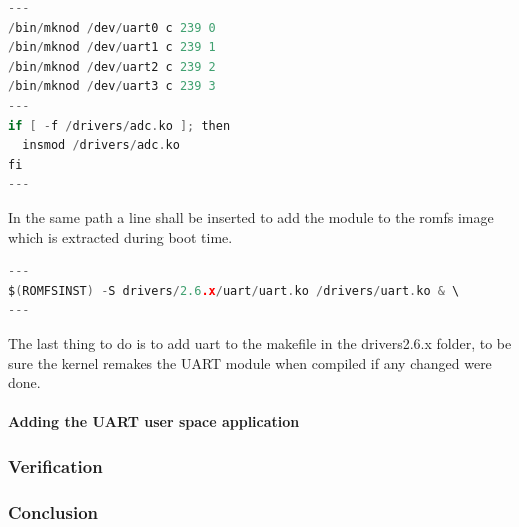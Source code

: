 \begin{lstlisting}[language=c]
---
/bin/mknod /dev/uart0 c 239 0 
/bin/mknod /dev/uart1 c 239 1
/bin/mknod /dev/uart2 c 239 2
/bin/mknod /dev/uart3 c 239 3
---
if [ -f /drivers/adc.ko ]; then
  insmod /drivers/adc.ko
fi
---
\end{lstlisting}
In the same path a line shall be inserted to add the module to the romfs image which is extracted during boot time.
\begin{lstlisting}[language=c]
---
$(ROMFSINST) -S drivers/2.6.x/uart/uart.ko /drivers/uart.ko & \
---
\end{lstlisting}
The last thing to do is to add uart to the makefile in the drivers\/2.6.x folder, to be sure the kernel remakes the UART module when compiled if any changed were done. 
\paragraph{Adding the UART user space application}
\subsubsection{Verification}
%
\subsubsection{Conclusion}


